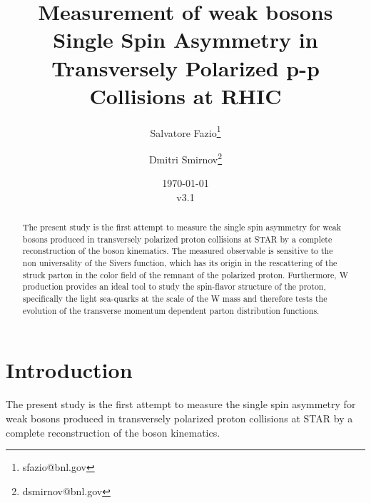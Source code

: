 \documentclass[12pt]{article}
\begin{document}
\setcounter{section}{0}
\setcounter{subsection}{0}
\setcounter{equation}{0}
\setcounter{figure}{0}
\setcounter{footnote}{0}
\setcounter{table}{0}

\title{Measurement of weak bosons Single Spin Asymmetry in Transversely Polarized p-p
Collisions at RHIC}

\author{Salvatore Fazio\thanks{sfazio@bnl.gov}}
\author{Dmitri Smirnov\thanks{dsmirnov@bnl.gov}}

\date{\today\\v3.1}

\maketitle


\begin{abstract}
The present study is the first attempt to measure the single spin asymmetry for weak bosons produced in transversely polarized proton collisions at STAR by a complete reconstruction of the boson kinematics. The measured observable is sensitive to the non universality of the Sivers function, which has its origin in the rescattering of the struck parton in the color field of the remnant of the polarized proton. Furthermore, W production provides an ideal tool to study the spin-flavor structure of the proton, specifically the light sea-quarks
at the scale of the W mass and therefore tests the evolution of the transverse momentum dependent parton distribution functions. 
\end{abstract}

\newpage
\tableofcontents 

\newpage
\linenumbers


\section{Introduction}

The present study is the first attempt to measure the single spin asymmetry for weak bosons produced
in transversely polarized proton collisions at STAR by a complete reconstruction of the boson kinematics. 
\end{document}
